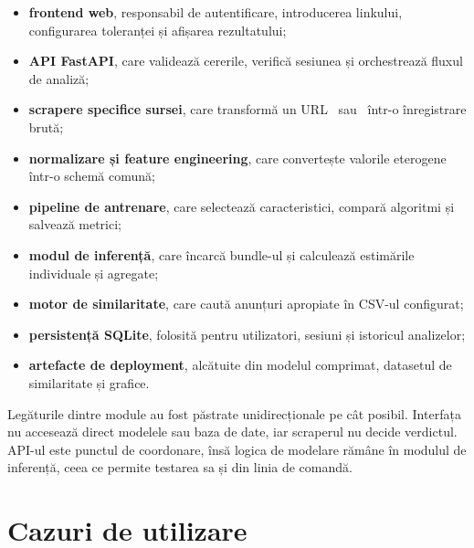 \begin{itemize}
    \item \textbf{frontend web}, responsabil de autentificare, introducerea linkului, configurarea toleranței și afișarea rezultatului;
    \item \textbf{API FastAPI}, care validează cererile, verifică sesiunea și orchestrează fluxul de analiză;
    \item \textbf{scrapere specifice sursei}, care transformă un URL \autovit\ sau \mobilede\ într-o înregistrare brută;
    \item \textbf{normalizare și feature engineering}, care convertește valorile eterogene într-o schemă comună;
    \item \textbf{pipeline de antrenare}, care selectează caracteristici, compară algoritmi și salvează metrici;
    \item \textbf{modul de inferență}, care încarcă bundle-ul și calculează estimările individuale și agregate;
    \item \textbf{motor de similaritate}, care caută anunțuri apropiate în CSV-ul configurat;
    \item \textbf{persistență SQLite}, folosită pentru utilizatori, sesiuni și istoricul analizelor;
    \item \textbf{artefacte de deployment}, alcătuite din modelul comprimat, datasetul de similaritate și grafice.
\end{itemize}


Legăturile dintre module au fost păstrate unidirecționale pe cât posibil. Interfața nu accesează direct modelele sau baza de date, iar scraperul nu decide verdictul. API-ul este punctul de coordonare, însă logica de modelare rămâne în modulul de inferență, ceea ce permite testarea sa și din linia de comandă.

\section{Cazuri de utilizare}
\label{sec:app-use-cases}

